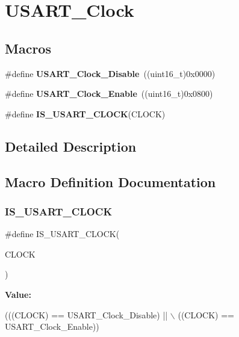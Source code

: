 \hypertarget{group___u_s_a_r_t___clock}{}\section{U\+S\+A\+R\+T\+\_\+\+Clock}
\label{group___u_s_a_r_t___clock}
\subsection*{Macros}
\begin{DoxyCompactItemize}
\item 
\mbox{\label{group___u_s_a_r_t___clock_ga56c12b81d19853c093e0a373d0c52fb5}} 
\#define {\bfseries U\+S\+A\+R\+T\+\_\+\+Clock\+\_\+\+Disable}~((uint16\+\_\+t)0x0000)
\item 
\mbox{\label{group___u_s_a_r_t___clock_gacfe029e2ec4f49ddde031fd031654caa}} 
\#define {\bfseries U\+S\+A\+R\+T\+\_\+\+Clock\+\_\+\+Enable}~((uint16\+\_\+t)0x0800)
\item 
\#define {\bfseries I\+S\+\_\+\+U\+S\+A\+R\+T\+\_\+\+C\+L\+O\+CK}(C\+L\+O\+CK)
\end{DoxyCompactItemize}


\subsection{Detailed Description}


\subsection{Macro Definition Documentation}
\mbox{\label{group___u_s_a_r_t___clock_ga0f1e1ba37690b21b7338ed3b06614cf6}} 
\subsubsection{\texorpdfstring{I\+S\+\_\+\+U\+S\+A\+R\+T\+\_\+\+C\+L\+O\+CK}{IS\_USART\_CLOCK}}
{\footnotesize\ttfamily \#define I\+S\+\_\+\+U\+S\+A\+R\+T\+\_\+\+C\+L\+O\+CK(\begin{DoxyParamCaption}\item[{}]{C\+L\+O\+CK }\end{DoxyParamCaption})}

{\bfseries Value\+:}
\begin{DoxyCode}
(((CLOCK) == USART\_Clock\_Disable) || \(\backslash\)
                               ((CLOCK) == USART\_Clock\_Enable))
\end{DoxyCode}
